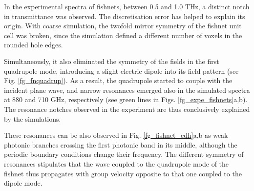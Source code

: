In the experimental spectra of fishnets,  between 0.5 and 1.0 THz, a distinct notch in transmittance was observed. The discretisation error has helped to explain its origin. With coarse simulation, the twofold mirror symmetry of the fishnet unit cell was broken, since the simulation defined a different number of voxels in the rounded hole edges. 

Simultaneously, it also eliminated the symmetry of the fields in the first quadrupole mode, introducing a slight electric dipole into its field pattern (see Fig. \ref{fg_fnquadrup}). As a result, the quadrupole started to couple with the incident plane wave, and narrow resonances emerged also in the simulated spectra at 880 and 710 GHz, respectively (see green lines in Figs. \ref{fg_expe_fishnets}a,b). The resonance notches observed in the experiment are thus conclusively explained by the simulations. %

These resonances can be also observed in Fig. \ref{fg_fishnet_cdh}a,b as weak photonic branches crossing the first photonic band in its middle, although the periodic boundary conditions change their frequency. The different symmetry of resonances stipulates that the wave coupled to the quadrupole mode of the fishnet thus propagates with group velocity  opposite to that one coupled to the dipole mode.


